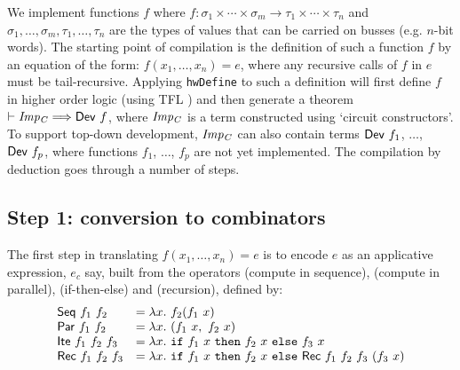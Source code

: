 We implement functions $f$ where
$f : \sigma_1\times\cdots\times\sigma_m \rightarrow \tau_1\times\cdots\times\tau_n$
and $\sigma_1,\ldots,\sigma_m,\tau_1,\ldots,\tau_n$ are the types of
values that can be carried on busses (e.g. $n$-bit words).
The starting point of compilation is the definition of such a function $f$ by an equation of
the form: $f(x_1,\ldots,x_n)=e$, where any recursive calls of $f$ in
$e$ must be tail-recursive. Applying \texttt{hwDefine} to such a
definition will first define $f$ in higher order logic (using TFL
\cite{slind:wfrec})  and then generate a theorem $\vdash {\it{Imp_C}}
\Longrightarrow \mathsf{Dev}~f$, where ${\it{Imp_C}}$ is a term
constructed using `circuit constructors'.
To support top-down development, ${\it{Imp_C}}$ can also contain terms
$\mathsf{Dev}~f_1$, $\ldots$, $\mathsf{Dev}~f_p$, where functions $f_1$,
$\ldots$, $f_p$ are not yet implemented. The compilation by deduction
goes through a number of steps.

\vspace*{-3mm}

\subsection*{Step 1: conversion to combinators}

The first step in translating $f(x_1,\ldots,x_n)=e$ is to encode $e$
as an applicative expression, $e_c$ say, built from the operators 
(compute in sequence),
 (compute in parallel),  (if-then-else) and  (recursion), defined by:
\[
\begin{array}{ll}
\mathsf{Seq}~f_1~f_2     &   = \lambda x.~f_2(f_1~x)\\
\mathsf{Par}~f_1~f_2     &   = \lambda x.~(f_1~x,~f_2~x)\\
\mathsf{Ite}~f_1~f_2~f_3 &   = \lambda x.~ \texttt{if}~f_1~x~\texttt{then}~f_2~x~\texttt{else}~f_3~x\\
\mathsf{Rec}~f_1~f_2~f_3 &   = \lambda x.~\texttt{if}~f_1~x~\texttt{then}~f_2~x~\texttt{else}~\mathsf{Rec}~f_1~f_2~f_3~(f_3~x)\\
\end{array}
\]

